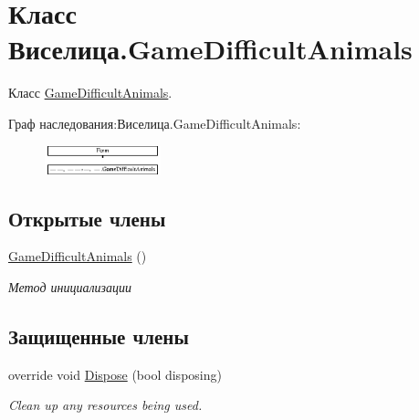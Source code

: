 \hypertarget{class_xD0_x92_xD0_xB8_xD1_x81_xD0_xB5_xD0_xBB_xD0_xB8_xD1_x86_xD0_xB0_1_1_game_difficult_animals}{\section{Класс Виселица.\+Game\+Difficult\+Animals}
\label{class_xD0_x92_xD0_xB8_xD1_x81_xD0_xB5_xD0_xBB_xD0_xB8_xD1_x86_xD0_xB0_1_1_game_difficult_animals}
}


Класс \hyperlink{class_xD0_x92_xD0_xB8_xD1_x81_xD0_xB5_xD0_xBB_xD0_xB8_xD1_x86_xD0_xB0_1_1_game_difficult_animals}{Game\+Difficult\+Animals}.  


Граф наследования\+:Виселица.\+Game\+Difficult\+Animals\+:\begin{figure}[H]
\begin{center}
\leavevmode
\includegraphics[height=0.821114cm]{class_xD0_x92_xD0_xB8_xD1_x81_xD0_xB5_xD0_xBB_xD0_xB8_xD1_x86_xD0_xB0_1_1_game_difficult_animals}
\end{center}
\end{figure}
\subsection*{Открытые члены}
\begin{DoxyCompactItemize}
\item 
\hyperlink{class_xD0_x92_xD0_xB8_xD1_x81_xD0_xB5_xD0_xBB_xD0_xB8_xD1_x86_xD0_xB0_1_1_game_difficult_animals_a49213804e9bc6c825cf719237718bb48}{Game\+Difficult\+Animals} ()
\begin{DoxyCompactList}\small\item\em Метод инициализации \end{DoxyCompactList}\end{DoxyCompactItemize}
\subsection*{Защищенные члены}
\begin{DoxyCompactItemize}
\item 
override void \hyperlink{class_xD0_x92_xD0_xB8_xD1_x81_xD0_xB5_xD0_xBB_xD0_xB8_xD1_x86_xD0_xB0_1_1_game_difficult_animals_af05de0debfe8cfe88b78d0c91efe2aba}{Dispose} (bool disposing)
\begin{DoxyCompactList}\small\item\em Clean up any resources being used. \end{DoxyCompactList}\end{DoxyCompactItemize}



